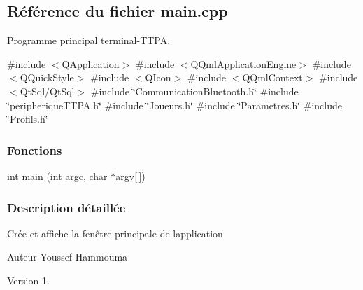 \hypertarget{terminal-_t_t_p_a_2main_8cpp}{}\subsection{Référence du fichier main.\+cpp}
\label{terminal-_t_t_p_a_2main_8cpp}


Programme principal terminal-\/\+T\+T\+PA.  


{\ttfamily \#include $<$Q\+Application$>$}\newline
{\ttfamily \#include $<$Q\+Qml\+Application\+Engine$>$}\newline
{\ttfamily \#include $<$Q\+Quick\+Style$>$}\newline
{\ttfamily \#include $<$Q\+Icon$>$}\newline
{\ttfamily \#include $<$Q\+Qml\+Context$>$}\newline
{\ttfamily \#include $<$Qt\+Sql/\+Qt\+Sql$>$}\newline
{\ttfamily \#include \char`\"{}Communication\+Bluetooth.\+h\char`\"{}}\newline
{\ttfamily \#include \char`\"{}peripherique\+T\+T\+P\+A.\+h\char`\"{}}\newline
{\ttfamily \#include \char`\"{}Joueurs.\+h\char`\"{}}\newline
{\ttfamily \#include \char`\"{}Parametres.\+h\char`\"{}}\newline
{\ttfamily \#include \char`\"{}Profils.\+h\char`\"{}}\newline
\subsubsection*{Fonctions}
\begin{DoxyCompactItemize}
\item 
int \hyperlink{terminal-_t_t_p_a_2main_8cpp_a0ddf1224851353fc92bfbff6f499fa97}{main} (int argc, char $\ast$argv\mbox{[}$\,$\mbox{]})
\end{DoxyCompactItemize}


\subsubsection{Description détaillée}
Crée et affiche la fenêtre principale de l\textquotesingle{}application

\begin{DoxyAuthor}{Auteur}
Youssef Hammouma
\end{DoxyAuthor}
\begin{DoxyVersion}{Version}
1. 
\end{DoxyVersion}


